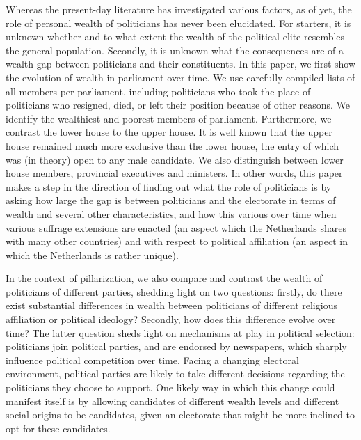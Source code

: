 Whereas the present-day literature has investigated various factors, as of yet, the role of personal wealth of politicians has never been elucidated. For starters, it is unknown whether and to what extent the wealth of the political elite resembles the general population. Secondly, it is unknown what the consequences are of a wealth gap between politicians and their constituents. In this paper, we first show the evolution of wealth in parliament over time. We use carefully compiled lists of all members per parliament, including politicians who took the place of politicians who resigned, died, or left their position because of other reasons. We identify the wealthiest and poorest members of parliament. Furthermore, we contrast the lower house to the upper house. It is well known that the upper house remained much more exclusive than the lower house, the entry of which was (in theory) open to any male candidate. \autocite{van1983toegang} We also distinguish between lower house members, provincial executives and ministers. In other words, this paper makes a step in the direction of finding out what the role of politicians is by asking how large the gap is between politicians and the electorate in terms of wealth and several other characteristics, and how this various over time when various suffrage extensions are enacted (an aspect which the Netherlands shares with many other countries) and with respect to political affiliation (an aspect in which the Netherlands is rather unique). 

In the context of pillarization, we also compare and contrast the wealth of politicians of different parties, shedding light on two questions: firstly, do there exist substantial differences in wealth between politicians of different religious affiliation or political ideology? Secondly, how does this difference evolve over time? The latter question sheds light on mechanisms at play in political selection: politicians join political parties, and are endorsed by newspapers, which sharply influence political competition over time. Facing a changing electoral environment, political parties are likely to take different decisions regarding the politicians they choose to support. One likely way in which this change could manifest itself is by allowing candidates of different wealth levels and different social origins to be candidates, given an electorate that might be more inclined to opt for these candidates. 

